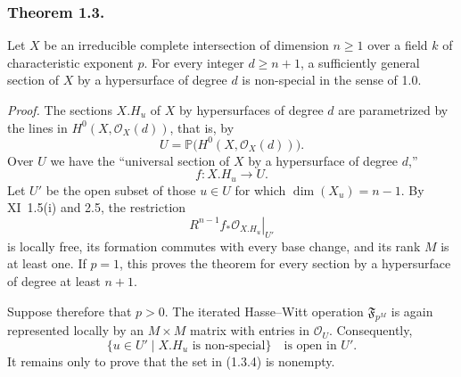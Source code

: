 \subsubsection*{Theorem 1.3.}
Let $X$ be an irreducible complete intersection of dimension $n\geq1$ over
a field $k$ of characteristic exponent $p$.  For every integer $d\geq n+1$,
a sufficiently general section of $X$ by a hypersurface of degree $d$ is
non-special in the sense of 1.0.

\medskip
\noindent\emph{Proof.}
The sections $X.H_u$ of $X$ by hypersurfaces of degree $d$ are parametrized
by the lines in $H^0(X,\mathcal O_X(d))$, that is, by
\begin{equation}\tag{1.3.1}
U=\mathbb P\bigl(H^0(X,\mathcal O_X(d))\bigr).
\end{equation}
Over $U$ we have the ``universal section of $X$ by a hypersurface of degree
$d$,''
\begin{equation}\tag{1.3.2}
f:X.H_u\longrightarrow U.
\end{equation}
Let $U'$ be the open subset of those $u\in U$ for which
$\dim(X_u)=n-1$.  By XI~1.5(i) and 2.5, the restriction
\begin{equation}\tag{1.3.3}
\left.R^{n-1}f_*\mathcal O_{X.H_u}\right|_{U'}
\end{equation}
is locally free, its formation commutes with every base change, and its rank
$M$ is at least one.  If $p=1$, this proves the theorem for every section by
a hypersurface of degree at least $n+1$.

Suppose therefore that $p>0$.  The iterated Hasse--Witt operation
$\mathfrak F_{p^M}$ is again represented locally by an $M\times M$ matrix
with entries in $\mathcal O_U$.  Consequently,
\begin{equation}\tag{1.3.4}
\{u\in U'\mid X.H_u\text{ is non-special}\}
\quad\text{is open in }U'.
\end{equation}
It remains only to prove that the set in (1.3.4) is nonempty.

